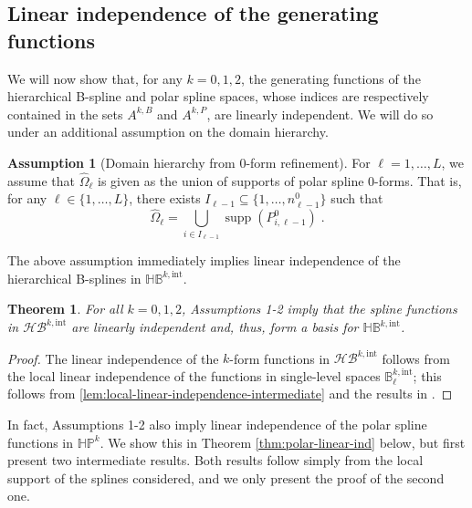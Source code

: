 \documentclass[10pt]{article}
\DeclareMathOperator{\supp}{supp}
\newcommand{\suppwp}[1]{\supp{\left(#1\right)}}
\newcommand{\basis}[1]{\mathcal{#1}}
\newcommand{\vSpace}[1]{\mathbb{#1}}
\newcommand{\tpDomain}{\widehat{\Omega}}
\newcommand{\bsp}{B}
\newcommand{\bspS}{\vSpace{\bsp}}
\newcommand{\polar}{P}
\newcommand{\tint}{\mathrm{int}}
\newcommand{\hSpace}[1]{\mathit{\vSpace{H}\vSpace{#1}}}
\newcommand{\hBasis}[1]{\mathit{\basis{H}\basis{#1}}}
\newcommand{\activeS}[2]{A^{#1}_{#2}}
\theoremstyle{plain}
\newtheorem{theorem}{Theorem}[section]
\theoremstyle{definition}
\newtheorem{assumption}{Assumption}
\theoremstyle{remark}
\begin{document}
\subsection{Linear independence of the generating functions}
\label{sec:construction-linear-ind}

We will now show that, for any $k = 0, 1, 2$, the generating functions of the hierarchical B-spline and polar spline spaces, whose indices are respectively contained in the sets $\activeS{k,\bsp}{}$ and $\activeS{k,\polar}{}$, are linearly independent.
We will do so under an additional assumption on the domain hierarchy.

\begin{assumption}[Domain hierarchy from $0$-form refinement]\label{ass:refinement-domains}
    For $\ell=1, \dots, L$, we assume that $\tpDomain_{\ell}$ is given as the union of
	supports of polar spline $0$-forms.
    That is, for any $\ell \in \{1, \dots, L\}$, there exists $I_{\ell-1} \subseteq \{1, \dots, n^0_{\ell-1}\}$ such that
    \begin{equation}
        \tpDomain_{\ell} = \bigcup_{i \in I_{\ell-1}}\suppwp{P^0_{i,\ell-1}}\;.
    \end{equation}
\end{assumption}

The above assumption immediately implies linear independence of the hierarchical B-splines in $\hSpace{\bsp}^{k,\tint}$.
\begin{theorem}
    \label{thm:bspline-linear-ind}
    For all $k = 0, 1, 2$, Assumptions 1-2 imply that the spline functions in $\hBasis{\bsp}^{k,\tint}$ are linearly independent and, thus, form a basis for $\hSpace{\bsp}^{k,\tint}$.
\end{theorem}
\begin{proof}
    The linear independence of the $k$-form functions in $\hBasis{\bsp}^{k,\tint}$ follows from the local linear independence of the functions in single-level spaces $\bspS^{k,\tint}_\ell$; this follows from \cref{lem:local-linear-independence-intermediate} and the results in \cite{Giannelli:2012}.
\end{proof}

In fact, Assumptions 1-2 also imply linear independence of the polar spline functions in $\hSpace{\polar}^k$.
We show this in Theorem \ref{thm:polar-linear-ind} below, but first present two intermediate results.
Both results follow simply from the local support of the splines considered, and we only present the proof of the second one.
\end{document}
